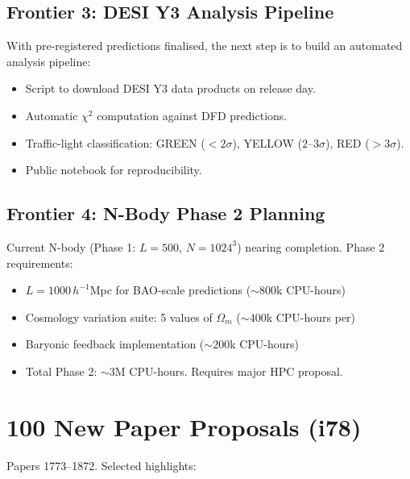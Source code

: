 \documentclass[11pt,a4paper]{article}
\begin{document}
\subsection{Frontier 3: DESI Y3 Analysis Pipeline}
With pre-registered predictions finalised, the next step is to build an automated analysis pipeline:
\begin{itemize}[nosep]
\item Script to download DESI Y3 data products on release day.
\item Automatic $\chi^2$ computation against DFD predictions.
\item Traffic-light classification: GREEN ($< 2\sigma$), YELLOW ($2$--$3\sigma$), RED ($> 3\sigma$).
\item Public notebook for reproducibility.
\end{itemize}

\subsection{Frontier 4: N-Body Phase 2 Planning}
Current N-body (Phase 1: $L = 500$, $N = 1024^3$) nearing completion. Phase 2 requirements:
\begin{itemize}[nosep]
\item $L = 1000\,h^{-1}$Mpc for BAO-scale predictions ($\sim 800$k CPU-hours)
\item Cosmology variation suite: 5 values of $\Omega_m$ ($\sim 400$k CPU-hours per)
\item Baryonic feedback implementation ($\sim 200$k CPU-hours)
\item Total Phase 2: $\sim 3$M CPU-hours. Requires major HPC proposal.
\end{itemize}

\section{100 New Paper Proposals (i78)}

Papers 1773--1872. Selected highlights:
\end{document}
